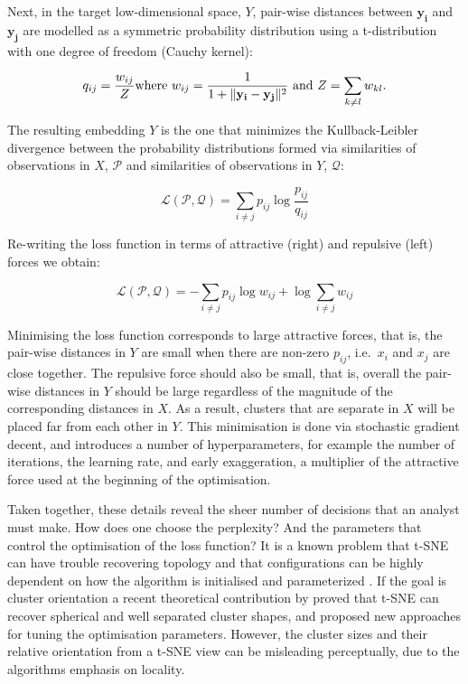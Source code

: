 \documentclass[article,notitle]{jdssv}
\begin{document}
Next, in the target low-dimensional space, \(Y\), pair-wise distances between
\(\mathbf{y_i}\) and \(\mathbf{y_j}\) are modelled as a symmetric probability
distribution using a t-distribution with one degree of freedom (Cauchy kernel):

\[ q_{ij} = \frac{w_{ij}}{Z} \\ \text{where } w_{ij} = \frac{1}{ 1 + \lVert
\mathbf{y_i - y_j} \rVert ^ 2} \text{ and } Z = \sum_{k \ne l} w_{kl}. \]

The resulting embedding \(Y\) is the one that minimizes the Kullback-Leibler
divergence between the probability distributions formed via similarities of
observations in \(X\), \(\mathcal{P}\) and similarities of observations in \(Y\),
\(\mathcal{Q}\):

\[ \mathcal{L(\mathcal{P}, \mathcal{Q})} = \sum_{i \ne j} p_{ij} \log
\frac{p_{ij}}{q_{ij}}\]

Re-writing the loss function in terms of attractive (right) and repulsive
(left) forces we obtain:

\[ \mathcal{L(\mathcal{P}, \mathcal{Q})} = -\sum_{i \ne j} p_{ij}\log w_{ij} +
\log\sum_{i \ne j} w_{ij} \]

Minimising the loss function corresponds to large attractive
forces, that is, the pair-wise distances in \(Y\) are small when there are
non-zero \(p_{ij}\), i.e.~\(x_i\) and \(x_j\) are close together. The repulsive force
should also be small, that is, overall the
pair-wise distances in \(Y\) should be large regardless of the magnitude of the
corresponding distances in \(X\). As a result, clusters that are separate in \(X\)
will be placed far from each other in \(Y\).
This minimisation is done via stochastic gradient decent,
and introduces a number of hyperparameters, for example the number of iterations,
the learning rate, and early exaggeration, a multiplier of the attractive force
used at the beginning of the optimisation.

Taken together, these details reveal the sheer number of decisions that an
analyst must make. How does one choose the perplexity? And the
parameters that control the optimisation of the loss function?
It is a known problem that
t-SNE can have trouble recovering topology and that configurations can be
highly dependent on how the algorithm is initialised and parameterized
\citep{Wattenberg2016-ji, Kobak2019-lm, Melville2020}. If the goal is cluster
orientation a recent theoretical contribution by \citet{Linderman2019-dq} proved that
t-SNE can recover spherical and well separated cluster shapes, and proposed new
approaches for tuning the optimisation parameters. However, the cluster sizes
and their relative orientation from a t-SNE view can be misleading
perceptually, due to the algorithms emphasis on locality.
\end{document}
